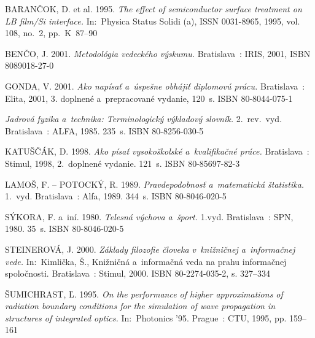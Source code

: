 \begin{thebibliography}{999}

BARANČOK, D. et al. 1995. \emph{The effect of semiconductor surface
treatment on LB film/Si interface.} In:~Physica Status Solidi (a), 
ISSN 0031-8965, 1995, vol. 108, no.~2, \mbox{pp. K~87--90}

BENČO, J. 2001. \emph{Metodológia vedeckého výskumu.} Bratislava~:
IRIS, 2001, ISBN 80\discretionary{-}{-}{-}89018-27-0

GONDA, V. 2001. \emph{Ako napísať a~úspešne obhájiť diplomovú prácu.}
Bratislava~: Elita, 2001, 3. doplnené a~prepracované vydanie, 120~s.
ISBN 80-8044-075-1

\emph{Jadrová fyzika a~technika: Terminologický výkladový slovník.}
2.~rev.~vyd. Bratislava~: ALFA, 1985. 235~s. ISBN 80-8256-030-5

KATUŠČÁK, D. 1998. \emph{Ako písať vysokoškolské a~kvalifikačné
práce.} Bratislava~: Stimul, 1998, 2.~doplnené vydanie. 121~s. ISBN
80-85697-82-3

LAMOŠ, F. -- POTOCKÝ, R. 1989. \emph{Pravdepodobnosť a~matematická
štatistika.} 1.~vyd. Bratislava~: Alfa, 1989. 344~s. ISBN 80-8046-020-5

SÝKORA, F. a~iní. 1980. \emph{Telesná výchova a~šport.} 1.vyd.
Bratislava~: SPN, 1980. 35~s. ISBN 80-8046-020-5

STEINEROVÁ, J. 2000. \emph{Základy filozofie človeka v~knižničnej
a~informačnej vede.} In:~Kimlička, Š., Knižničná a~informačná veda na
prahu informačnej spoločnosti. Bratislava~: Stimul, 2000. ISBN
80-2274-035-2, s. 327--334

ŠUMICHRAST, Ľ. 1995. \emph{On the performance of higher approximations
of radiation boundary conditions for the simulation of wave propagation
in structures of integrated optics.} In:~Photonics '95. Prague~: CTU,
1995, pp. 159--161
\end{thebibliography}